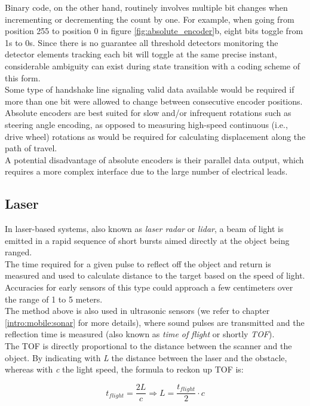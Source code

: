 Binary code, on the other hand, routinely involves multiple bit changes when
incrementing or decrementing the count by one. For example, when going from
position 255 to position 0 in figure \ref{fig:absolute_encoder}b, eight
bits toggle from 1s to 0s. Since
there is no guarantee all threshold detectors monitoring the detector elements
tracking each bit will toggle at the same precise instant, considerable ambiguity
can exist during state transition with a coding scheme of this form.
\\
Some type of handshake line signaling valid data available would be required
if more than one bit were allowed to change between consecutive encoder positions.
\\
Absolute encoders are best suited for slow and/or infrequent rotations such
as steering angle encoding, as opposed to measuring high-speed continuous
(i.e., drive wheel) rotations as would be required for calculating displacement
along the path of travel.
\\
A potential disadvantage of absolute encoders is their parallel data output,
which requires a more complex interface due to the large number of electrical leads.


\subsection{Laser}
\label{intro:mobile:laser}

In laser-based systems, also known as \textit{laser radar} or
\textit{lidar}, a beam of light is emitted in a rapid sequence
of short bursts aimed directly at the object being ranged.
\\
The time required for a given pulse to reflect off the object
and return is measured and used to calculate distance to the
target based on the speed of light. Accuracies for early sensors
of this type could approach a few centimeters over the range
of 1 to 5 meters.
\\
The method above is also used in ultrasonic sensors (we refer to
chapter \ref{intro:mobile:sonar} for more details), where sound pulses
are transmitted and the reflection time is measured (also known as
\textit{time of flight} or shortly \textit{TOF}).
\\
The TOF is directly proportional to the distance between the scanner
and the object. By indicating with \textit{L} the distance between
the laser and the obstacle, whereas with \textit{c} the light speed,
the formula to reckon up TOF is:

\[
t_{flight} = \frac{2L}{c}  \Longrightarrow  L = \frac{t_{flight}}{2}\cdot c
\]

